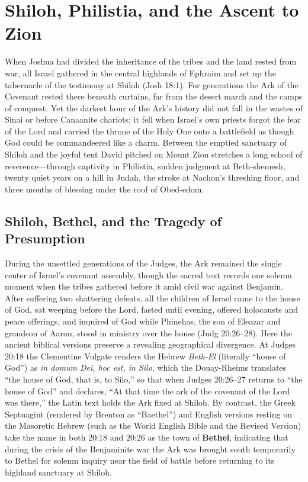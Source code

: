 \section{Shiloh, Philistia, and the Ascent to Zion}\label{sec:captivity-hiddenness-zion}

When Joshua had divided the inheritance of the tribes and the land rested from war, all Israel gathered in the central highlands of Ephraim and set up the tabernacle of the testimony at Shiloh (Josh 18:1). For generations the Ark of the Covenant rested there beneath curtains, far from the desert march and the camps of conquest. Yet the darkest hour of the Ark's history did not fall in the wastes of Sinai or before Canaanite chariots; it fell when Israel's own priests forgot the fear of the Lord and carried the throne of the Holy One onto a battlefield as though God could be commandeered like a charm. Between the emptied sanctuary of Shiloh and the joyful tent David pitched on Mount Zion stretches a long school of reverence---through captivity in Philistia, sudden judgment at Beth-shemesh, twenty quiet years on a hill in Judah, the stroke at Nachon's threshing floor, and three months of blessing under the roof of Obed-edom.

\subsection{Shiloh, Bethel, and the Tragedy of Presumption}

During the unsettled generations of the Judges, the Ark remained the single center of Israel's covenant assembly, though the sacred text records one solemn moment when the tribes gathered before it amid civil war against Benjamin. After suffering two shattering defeats, all the children of Israel came to the house of God, sat weeping before the Lord, fasted until evening, offered holocausts and peace offerings, and inquired of God while Phinehas, the son of Eleazar and grandson of Aaron, stood in ministry over the house (Judg 20:26--28). Here the ancient biblical versions preserve a revealing geographical divergence. At Judges 20:18 the Clementine Vulgate renders the Hebrew \textit{Beth-El} (literally ``house of God'') as \textit{in domum Dei, hoc est, in Silo}, which the Douay-Rheims translates ``the house of God, that is, to Silo,'' so that when Judges 20:26--27 returns to ``the house of God'' and declares, ``At that time the ark of the covenant of the Lord was there,'' the Latin text holds the Ark fixed at Shiloh. By contrast, the Greek Septuagint (rendered by Brenton as ``Baethel'') and English versions resting on the Masoretic Hebrew (such as the World English Bible and the Revised Version) take the name in both 20:18 and 20:26 as the town of \textbf{Bethel}, indicating that during the crisis of the Benjaminite war the Ark was brought south temporarily to Bethel for solemn inquiry near the field of battle before returning to its highland sanctuary at Shiloh.

